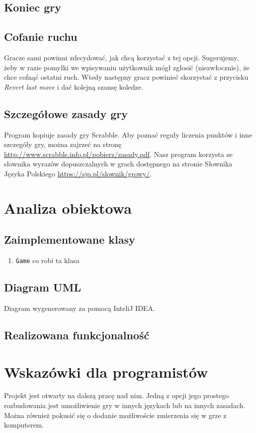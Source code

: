 \documentclass[a4paper]{article}
\begin{document}
\subsection{Koniec gry}
\subsection{Cofanie ruchu}
Gracze sami powinni zdecydować, jak chcą korzystać z tej opcji. Sugerujemy, żeby w razie pomyłki we wpisywaniu użytkownik mógł zgłosić (niezwłocznie), że chce cofnąć ostatni ruch. Wtedy następny gracz powinieć skorzystać z przycisku \textit{Revert last move} i dać kolejną szansę koledze.
\subsection{Szczegółowe zasady gry}
Program kopiuje zasady gry Scrabble. Aby poznać reguły liczenia punktów i inne szczegóły gry, można zajrzeć na stronę \url{http://www.scrabble.info.pl/pobierz/zasady.pdf}. Nasz program korzysta ze słownika wyrazów dopuszczalnych w grach dostępnego na stronie Słownika Języka Polskiego \url{https://sjp.pl/slownik/growy/}.
\section{Analiza obiektowa}
\subsection{Zaimplementowane klasy}
\begin{enumerate}
\item[] \texttt{Game} co robi ta klasa
\end{enumerate}
\subsection{Diagram UML}
Diagram wygenerowany za pomocą InteliJ IDEA.
\subsection{Realizowana funkcjonalność}
\section{Wskazówki dla programistów}
Projekt jest otwarty na dalszą pracę nad nim. Jedną z opcji jego prostego rozbudowania jest umożliwienie gry w innych językach lub na innych zasadach. Można również pokusić się o dodanie możliwoście zmierzenia się w grze z komputerem.
\end{document}
